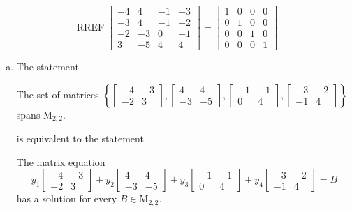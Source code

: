\begin{exerciseAnswer} 


\[\operatorname{RREF} \left[\begin{array}{cccc}
-4 & 4 & -1 & -3 \\
-3 & 4 & -1 & -2 \\
-2 & -3 & 0 & -1 \\
3 & -5 & 4 & 4
\end{array}\right] = \left[\begin{array}{cccc}
1 & 0 & 0 & 0 \\
0 & 1 & 0 & 0 \\
0 & 0 & 1 & 0 \\
0 & 0 & 0 & 1
\end{array}\right] \]


\begin{enumerate}[(a)]
\item The statement 
\begin{center}\begin{minipage}{0.8\textwidth}
 The set of matrices \( \left\{ \left[\begin{array}{cc}
-4 & -3 \\
-2 & 3
\end{array}\right] , \left[\begin{array}{cc}
4 & 4 \\
-3 & -5
\end{array}\right] , \left[\begin{array}{cc}
-1 & -1 \\
0 & 4
\end{array}\right] , \left[\begin{array}{cc}
-3 & -2 \\
-1 & 4
\end{array}\right] \right\} \) spans \(\mathrm{M}_{2,2}\). 
\end{minipage}\end{center}
     is equivalent to the statement 
\begin{center}\begin{minipage}{0.8\textwidth}
 The matrix equation \[ y_{1} \left[\begin{array}{cc}
-4 & -3 \\
-2 & 3
\end{array}\right] + y_{2} \left[\begin{array}{cc}
4 & 4 \\
-3 & -5
\end{array}\right] + y_{3} \left[\begin{array}{cc}
-1 & -1 \\
0 & 4
\end{array}\right] + y_{4} \left[\begin{array}{cc}
-3 & -2 \\
-1 & 4
\end{array}\right] =B\] has a solution for every \(B \in \mathrm{M}_{2,2}\). 
\end{minipage}\end{center}
    

\end{enumerate}
\end{exerciseAnswer}
